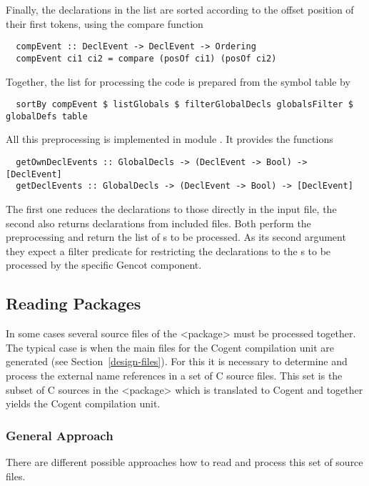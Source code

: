 Finally, the declarations in the list are sorted according to the offset position of their first tokens, using the
compare function
\begin{verbatim}
  compEvent :: DeclEvent -> DeclEvent -> Ordering
  compEvent ci1 ci2 = compare (posOf ci1) (posOf ci2)
\end{verbatim}

Together, the list for processing the code is prepared from the symbol table  by
\begin{verbatim}
  sortBy compEvent $ listGlobals $ filterGlobalDecls globalsFilter $ globalDefs table
\end{verbatim}

All this preprocessing is implemented in module . It provides the functions
\begin{verbatim}
  getOwnDeclEvents :: GlobalDecls -> (DeclEvent -> Bool) -> [DeclEvent]
  getDeclEvents :: GlobalDecls -> (DeclEvent -> Bool) -> [DeclEvent]
\end{verbatim}
The first one reduces the declarations to those directly in the input file, the second also returns
declarations from included files. 
Both perform the preprocessing and return the list of s to be processed.
As its second argument they expect a filter predicate for restricting the declarations to the
s to be processed by the specific Gencot component.

\subsection{Reading Packages}
\label{impl-ccode-package}

In some cases several source files of the <package> must be processed together. The typical case is when the main
files for the Cogent compilation unit are generated (see Section~\ref{design-files}). For this it is necessary 
to determine and process the external name references in a set of
C source files. This set is the subset of C sources in the <package> which is translated to Cogent and together yields
the Cogent compilation unit. 

\subsubsection{General Approach}

There are different possible approaches how to read and process this set of source files.

